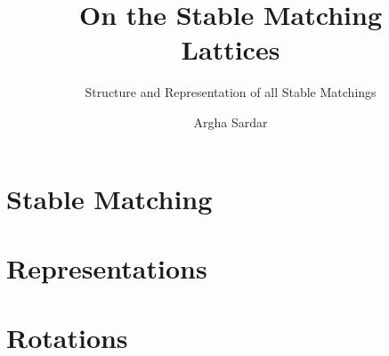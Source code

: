 \documentclass[english, msc, oneside]{layout/observatory-thesis}
\theoremstyle{definition}
\begin{document}
\title{\textbf{On the Stable Matching \\Lattices}}
\subtitle{Structure and Representation of all Stable Matchings} 
\subject{\thesistypeshort thesis}
\author{Argha Sardar}
\address{Indian Institute of Technology, Gandhinagar, Gujarat 382355, India}

\frontmatter 

\makecover 
\maketitle 

\dedication{Dedicated to my Maa and Baba who believed in me.}

\disclaimer



\tableofcontents


\mainmatter 

\chapter{Stable Matching}











\chapter{Representations}











\chapter{Rotations}











\end{document}
